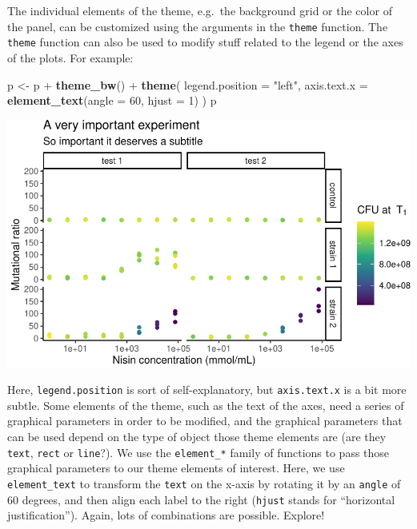 \documentclass[]{book}
\newenvironment{Shaded}{}{}
\newcommand{\DataTypeTok}[1]{\textcolor[rgb]{0.56,0.13,0.00}{#1}}
\newcommand{\DecValTok}[1]{\textcolor[rgb]{0.25,0.63,0.44}{#1}}
\newcommand{\KeywordTok}[1]{\textcolor[rgb]{0.00,0.44,0.13}{\textbf{#1}}}
\newcommand{\NormalTok}[1]{#1}
\newcommand{\OperatorTok}[1]{\textcolor[rgb]{0.40,0.40,0.40}{#1}}
\newcommand{\StringTok}[1]{\textcolor[rgb]{0.25,0.44,0.63}{#1}}
\begin{document}
The individual elements of the theme, e.g.~the background grid or the color of the panel, can be customized using the arguments in the \texttt{theme} function. The \texttt{theme} function can also be used to modify stuff related to the legend or the axes of the plots. For example:

\begin{Shaded}
\begin{Highlighting}[]
\NormalTok{p <-}\StringTok{ }\NormalTok{p }\OperatorTok{+}\StringTok{ }
\StringTok{  }\KeywordTok{theme_bw}\NormalTok{() }\OperatorTok{+}
\StringTok{  }\KeywordTok{theme}\NormalTok{(}
    \DataTypeTok{legend.position =} \StringTok{"left"}\NormalTok{, }
    \DataTypeTok{axis.text.x =} \KeywordTok{element_text}\NormalTok{(}\DataTypeTok{angle =} \DecValTok{60}\NormalTok{, }\DataTypeTok{hjust =} \DecValTok{1}\NormalTok{)}
\NormalTok{  )}
\NormalTok{p}
\end{Highlighting}
\end{Shaded}

\begin{center}\includegraphics[width=\textwidth]{TRES-Tidy-Tutorial_files/figure-latex/unnamed-chunk-144-1} \end{center}

Here, \texttt{legend.position} is sort of self-explanatory, but \texttt{axis.text.x} is a bit more subtle. Some elements of the theme, such as the text of the axes, need a series of graphical parameters in order to be modified, and the graphical parameters that can be used depend on the type of object those theme elements are (are they \texttt{text}, \texttt{rect} or \texttt{line}?). We use the \texttt{element\_*} family of functions to pass those graphical parameters to our theme elements of interest. Here, we use \texttt{element\_text} to transform the \texttt{text} on the x-axis by rotating it by an \texttt{angle} of 60 degrees, and then align each label to the right (\texttt{hjust} stands for ``horizontal justification''). Again, lots of combinations are possible. Explore!
\end{document}
